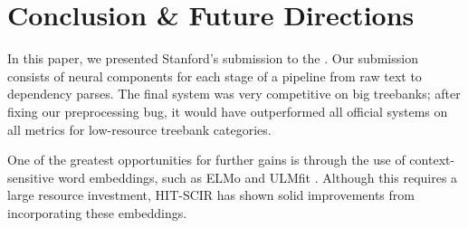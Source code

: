 \documentclass[11pt,a4paper]{article}
\begin{document}
%
 
\section{Conclusion \& Future Directions}

In this paper, we presented Stanford's submission to the \udst. Our submission consists of neural components for each stage of a pipeline from raw text to dependency parses. The final system was very competitive on big treebanks; after fixing our preprocessing bug, it would have outperformed all official systems on all metrics for low-resource treebank categories.

One of the greatest opportunities for further gains is through the use of context-sensitive word embeddings, such as ELMo \cite{peters2018deep} and ULMfit \cite{howard2018universal}.
Although this requires a large resource investment, HIT-SCIR \cite{che18towards} has shown solid improvements from incorporating these embeddings.
 


\end{document}
